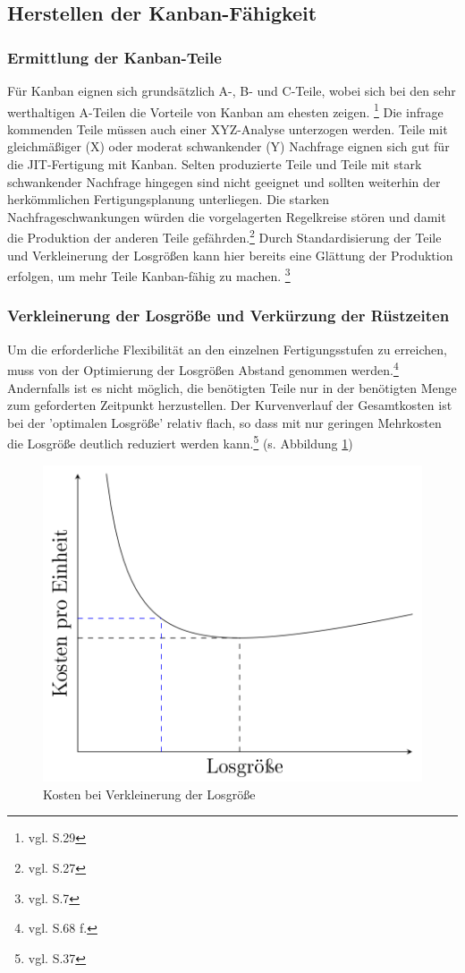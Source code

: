 \subsection{Herstellen der Kanban-Fähigkeit}
\subsubsection{Ermittlung der Kanban-Teile}
Für Kanban eignen sich grundsätzlich A-, B- und C-Teile, wobei sich bei den sehr 
werthaltigen A-Teilen die Vorteile von Kanban am ehesten zeigen. \footnote{vgl. \cite{Geiger2011Kanban} S.29}
Die infrage kommenden Teile müssen auch einer XYZ-Analyse unterzogen werden. 
Teile mit gleichmäßiger (X) oder moderat schwankender (Y) Nachfrage eignen sich gut für die JIT-Fertigung mit Kanban.
Selten produzierte Teile und Teile mit stark schwankender Nachfrage hingegen sind nicht geeignet und sollten 
weiterhin der herkömmlichen Fertigungsplanung unterliegen. Die starken Nachfrageschwankungen 
würden die vorgelagerten Regelkreise stören und damit die Produktion der anderen Teile gefährden.\footnote{vgl. \cite{Geiger2011Kanban} S.27}
Durch Standardisierung der Teile und Verkleinerung der Losgrößen kann hier 
bereits eine Glättung der Produktion erfolgen, um mehr Teile Kanban-fähig zu machen. \footnote{vgl. \cite{Takeda2012SPS} S.7}

\subsubsection{Verkleinerung der Losgröße und Verkürzung der Rüstzeiten}
Um die erforderliche Flexibilität an den einzelnen Fertigungsstufen zu erreichen, 
muss von der Optimierung der Losgrößen Abstand genommen werden.\footnote{vgl. \cite{Takeda2012SPS} S.68 f.}
Andernfalls ist es nicht möglich, die benötigten Teile nur in der benötigten Menge zum geforderten Zeitpunkt herzustellen.
Der Kurvenverlauf der Gesamtkosten ist bei der 'optimalen Losgröße' relativ flach, 
so dass mit nur geringen Mehrkosten die Losgröße deutlich reduziert werden kann.\footnote{vgl. \cite{Geiger2011Kanban} S.37}
(s. Abbildung \ref{Losgroesse})
\begin{figure}[h]
\centering
\includegraphics[width=.60\textwidth]{img/losgroessenverkleinerung.png}
\caption[Kosten bei Verkleinerung der Losgröße]{Kosten bei Verkleinerung der Losgröße\footnotemark}
\label{Losgroesse}
\end{figure}

